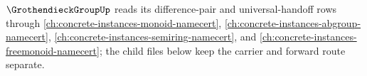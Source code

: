 $\GrothendieckGroupUp$ reads its difference-pair and universal-handoff rows through \autoref{ch:concrete-instances-monoid-namecert}, \autoref{ch:concrete-instances-abgroup-namecert}, \autoref{ch:concrete-instances-semiring-namecert}, and \autoref{ch:concrete-instances-freemonoid-namecert}; the child files below keep the carrier and forward route separate.





